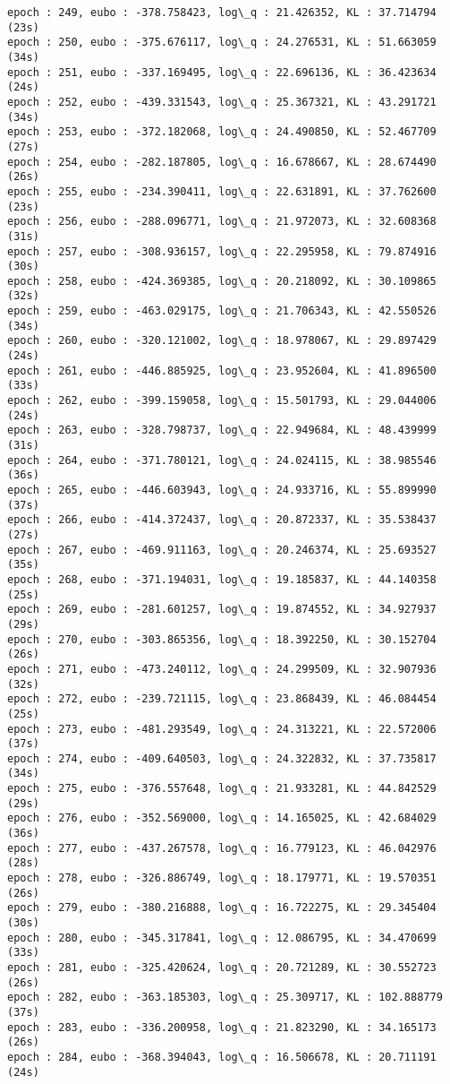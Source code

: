 \documentclass[11pt]{article}
\begin{document}
\begin{Verbatim}[commandchars=\\\{\}]
epoch : 249, eubo : -378.758423, log\_q : 21.426352, KL : 37.714794 (23s)
epoch : 250, eubo : -375.676117, log\_q : 24.276531, KL : 51.663059 (34s)
epoch : 251, eubo : -337.169495, log\_q : 22.696136, KL : 36.423634 (24s)
epoch : 252, eubo : -439.331543, log\_q : 25.367321, KL : 43.291721 (34s)
epoch : 253, eubo : -372.182068, log\_q : 24.490850, KL : 52.467709 (27s)
epoch : 254, eubo : -282.187805, log\_q : 16.678667, KL : 28.674490 (26s)
epoch : 255, eubo : -234.390411, log\_q : 22.631891, KL : 37.762600 (23s)
epoch : 256, eubo : -288.096771, log\_q : 21.972073, KL : 32.608368 (31s)
epoch : 257, eubo : -308.936157, log\_q : 22.295958, KL : 79.874916 (30s)
epoch : 258, eubo : -424.369385, log\_q : 20.218092, KL : 30.109865 (32s)
epoch : 259, eubo : -463.029175, log\_q : 21.706343, KL : 42.550526 (34s)
epoch : 260, eubo : -320.121002, log\_q : 18.978067, KL : 29.897429 (24s)
epoch : 261, eubo : -446.885925, log\_q : 23.952604, KL : 41.896500 (33s)
epoch : 262, eubo : -399.159058, log\_q : 15.501793, KL : 29.044006 (24s)
epoch : 263, eubo : -328.798737, log\_q : 22.949684, KL : 48.439999 (31s)
epoch : 264, eubo : -371.780121, log\_q : 24.024115, KL : 38.985546 (36s)
epoch : 265, eubo : -446.603943, log\_q : 24.933716, KL : 55.899990 (37s)
epoch : 266, eubo : -414.372437, log\_q : 20.872337, KL : 35.538437 (27s)
epoch : 267, eubo : -469.911163, log\_q : 20.246374, KL : 25.693527 (35s)
epoch : 268, eubo : -371.194031, log\_q : 19.185837, KL : 44.140358 (25s)
epoch : 269, eubo : -281.601257, log\_q : 19.874552, KL : 34.927937 (29s)
epoch : 270, eubo : -303.865356, log\_q : 18.392250, KL : 30.152704 (26s)
epoch : 271, eubo : -473.240112, log\_q : 24.299509, KL : 32.907936 (32s)
epoch : 272, eubo : -239.721115, log\_q : 23.868439, KL : 46.084454 (25s)
epoch : 273, eubo : -481.293549, log\_q : 24.313221, KL : 22.572006 (37s)
epoch : 274, eubo : -409.640503, log\_q : 24.322832, KL : 37.735817 (34s)
epoch : 275, eubo : -376.557648, log\_q : 21.933281, KL : 44.842529 (29s)
epoch : 276, eubo : -352.569000, log\_q : 14.165025, KL : 42.684029 (36s)
epoch : 277, eubo : -437.267578, log\_q : 16.779123, KL : 46.042976 (28s)
epoch : 278, eubo : -326.886749, log\_q : 18.179771, KL : 19.570351 (26s)
epoch : 279, eubo : -380.216888, log\_q : 16.722275, KL : 29.345404 (30s)
epoch : 280, eubo : -345.317841, log\_q : 12.086795, KL : 34.470699 (33s)
epoch : 281, eubo : -325.420624, log\_q : 20.721289, KL : 30.552723 (26s)
epoch : 282, eubo : -363.185303, log\_q : 25.309717, KL : 102.888779 (37s)
epoch : 283, eubo : -336.200958, log\_q : 21.823290, KL : 34.165173 (26s)
epoch : 284, eubo : -368.394043, log\_q : 16.506678, KL : 20.711191 (24s)

\end{Verbatim}
\end{document}
